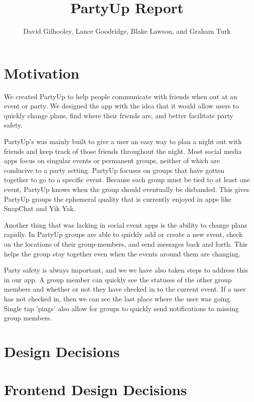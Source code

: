\documentclass[12pt]{article}
\title{PartyUp Report}
\author{David Gilhooley, Lance Goodridge, Blake Lawson, and Graham Turk}
\begin{document}
\pagestyle{plain}

\maketitle

\section{Motivation} %
\label{sec:Motivation}
We created PartyUp to help people communicate with friends when out at an event or party. We designed the app with the idea that it would allow users to quickly change plans, find where their friends are, and better facilitate party safety.

PartyUp's was mainly built to give a user an easy way to plan a night out with friends and keep track of those friends throughout the night. Most social media apps focus on singular events or permanent groups, neither of which are conducive to a party setting.
PartyUp focuses on groups that have gotten together to go to a specific event. Because each group must be tied to at least one event, PartyUp knows when the group should eventually be disbanded. This gives PartyUp groups the ephemeral quality that is currently enjoyed in apps like SnapChat and Yik Yak.

Another thing that was lacking in social event apps is the ability to change plans rapidly. In PartyUp groups are able to quickly add or create a new event, check on the locations of their group-members, and send messages back and forth. This helps the group stay together even when the events around them are changing. 

Party safety is always important, and we we have also taken steps to address this in our app. A group member can quickly see the statuses of the other group members and whether or not they have checked in to the current event. If a user has not checked in, then we can see the last place where the user was going. Single tap 'pings' also allow for groups to quickly send notifications to missing group members.

\section{Design Decisions} %
\label{sec:design_decisions}


\section{Frontend Design Decisions}
\end{document}
